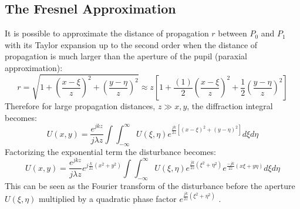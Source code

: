 \subsection{The Fresnel Approximation}
\label{sec:fresnelapprox}
It is possible to approximate the distance of propagation $r$ between $P_0$ and $P_1$ with its Taylor expansion up to the second order when the distance of propagation is much larger than the aperture of the pupil (paraxial approximation):
\begin{equation}
\label{eq:taylor}
r=\sqrt{1+\left(\dfrac{x-\xi}{z}\right)^2+\left(\dfrac{y-\eta}{z}\right)^2}\approx z\left[1+\frac{(1)}{2}\left(\dfrac{x-\xi}{z}\right)^2+\frac{1}{2}\left(\dfrac{y-\eta}{z}\right)^2\right]
\end{equation}
Therefore for large propagation distances, $z\gg x,y$, the diffraction integral becomes:
\begin{equation}
\label{eq:Fresnel}
	U(x,y)=\dfrac{e^{jkz}}{j\lambda z} \int\int_{-\infty}^{\infty}U(\xi,\eta)e^{\frac{jk}{2z}\left[(x-\xi)^2+(y-\eta)^2\right]} d\xi d\eta
\end{equation}
Factorizing the exponential term the disturbance becomes:
\begin{equation}
\label{eq:Fresnel1}
U(x,y)=\dfrac{e^{jkz}}{j\lambda z} e^{j\frac{k}{2z}(x^2+y^2)} \int\int_{-\infty}^{\infty}U(\xi,\eta)e^{\frac{jk}{2z}(\xi^2+\eta^2)}e^{\frac{-jk}{2z}(x\xi+y\eta)} d\xi d\eta
\end{equation}
This can be seen as the Fourier transform of the disturbance before the aperture $U(\xi,\eta)$ multiplied by a quadratic phase factor
 $e^{\frac{jk}{2z}(\xi^2+\eta^2)}$ \cite{goodman2005introduction}.
